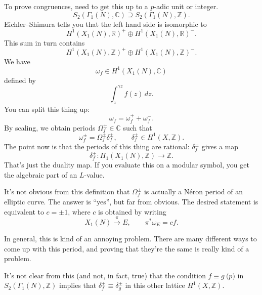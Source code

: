 \documentclass[reqno]{amsart} 
\begin{document}
To prove congruences, need to get this up to a $p$-adic unit or integer.
\begin{equation*}
  S_2(\Gamma_1(N), \mathbb{C}) \supseteq S_2(\Gamma_1(N), \mathbb{Z}).
\end{equation*}
Eichler--Shimura tells you that the left hand side is isomorphic to
\begin{equation*}
  H^1(X_1(N), \mathbb{R} )^+ \oplus H^1(X_1(N), \mathbb{R})^-.
\end{equation*}
This sum in turn contains
\begin{equation*}
  H^1(X_1(N), \mathbb{Z} )^+ \oplus H^1(X_1(N), \mathbb{Z})^-.
\end{equation*}
We have
\begin{equation*}
  \omega_f \in H^1(X_1(N), \mathbb{C})
\end{equation*}
defined by
\begin{equation*}
  \int_z^{\gamma z} f(z) \, d z.
\end{equation*}
You can split this thing up:
\begin{equation*}
  \omega_f = \omega_f^+ + \omega_f^-.
\end{equation*}
By scaling, we obtain periods $\Omega_f^{\pm} \in \mathbb{C}$ such that
\begin{equation*}
  \omega_f^{\pm} = \Omega_f^{\pm} \delta_f^{\pm}, \qquad \delta_f^{\pm} \in H^1(X, \mathbb{Z}).
\end{equation*}
The point now is that the periods of this thing are rational: $\delta_f^{\pm}$ gives a map
\begin{equation*}
  \delta_f^{\pm} : H_1(X_1(N), \mathbb{Z}) \rightarrow \mathbb{Z}.
\end{equation*}
That's just the duality map.  If you evaluate this on a modular symbol, you get the algebraic part of an $L$-value.

It's not obvious from this definition that $\Omega_f^{\pm}$ is actually a N{\'e}ron period of an elliptic curve.  The answer is ``yes'', but far from obvious.  The desired statement is equivalent to $c = \pm 1$, where $c$ is obtained by writing
\begin{equation*}
  X_1(N) \xrightarrow{\pi} E, \qquad \pi^\ast \omega_E = c f.
\end{equation*}

In general, this is kind of an annoying problem.  There are many different ways to come up with this period, and proving that they're the same is really kind of a problem.

It's not clear from this (and not, in fact, true) that the condition $f \equiv g \pod{p}$ in $S_2(\Gamma_1(N), \mathbb{Z})$ implies that $\delta_f^{\pm} \equiv \delta_g^{\pm}$ in this other lattice $H^1(X, \mathbb{Z})$.
\end{document}
